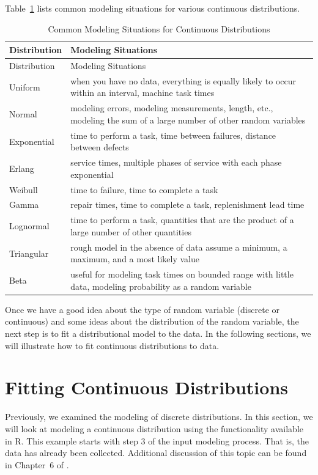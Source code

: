 \documentclass[
]{book}
\theoremstyle{definition}
\theoremstyle{definition}
\theoremstyle{definition}
\theoremstyle{definition}
\theoremstyle{remark}
\begin{document}
Table~\ref{tab:contD} lists common modeling situations for various
continuous distributions.

\hypertarget{tab:contD}{}
\begin{longtable}[]{@{}ll@{}}
\caption{\label{tab:contD} Common Modeling Situations for Continuous Distributions}\tabularnewline
\toprule
Distribution & Modeling Situations \\
\midrule
\endfirsthead
\toprule
Distribution & Modeling Situations \\
\midrule
\endhead
Uniform & when you have no data, everything is equally likely to occur within an interval, machine task times \\
Normal & modeling errors, modeling measurements, length, etc., modeling the sum of a large number of other random variables \\
Exponential & time to perform a task, time between failures, distance between defects \\
Erlang & service times, multiple phases of service with each phase exponential \\
Weibull & time to failure, time to complete a task \\
Gamma & repair times, time to complete a task, replenishment lead time \\
Lognormal & time to perform a task, quantities that are the product of a large number of other quantities \\
Triangular & rough model in the absence of data assume a minimum, a maximum, and a most likely value \\
Beta & useful for modeling task times on bounded range with little data, modeling probability as a random variable \\
\bottomrule
\end{longtable}

Once we have a good idea about the type of random variable (discrete or
continuous) and some ideas about the distribution of the random
variable, the next step is to fit a distributional model to the data. In the following sections, we will illustrate how to fit continuous distributions to data.

\hypertarget{app:idm:sec:fitContinuous}{%
\section{Fitting Continuous Distributions}\label{app:idm:sec:fitContinuous}}

Previously, we examined the modeling of discrete
distributions. In this section, we will look at modeling a continuous
distribution using the functionality available in R. This example starts
with step 3 of the input modeling process. That is, the data has already
been collected. Additional discussion of this topic can be found in
Chapter~6 of \citep{law2007simulation}.
\end{document}
